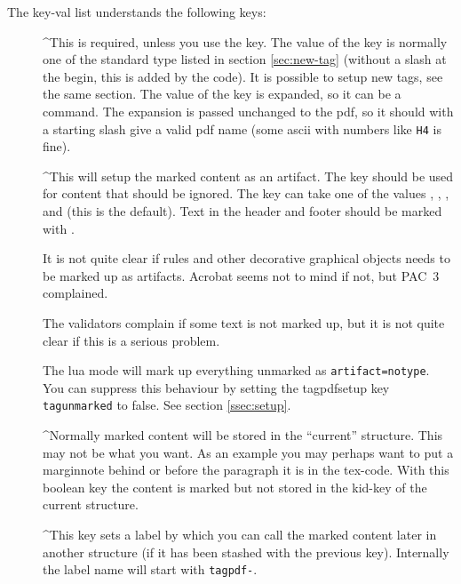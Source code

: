\documentclass[DIV=12,parskip=half-,bibliography=totoc]{scrartcl}
\begin{document}
\TagP The key-val list understands the following keys:\TagPend
\begin{description}
  \item[]
  \TagP^This is required, unless you use the  key. The value of the key is normally one of the standard type listed in section \ref{sec:new-tag} (without a slash at the begin, this is added by the code). It is possible to setup new tags, see the same section. The value of the key is expanded, so it can be a command. The expansion is passed unchanged to the pdf, so it should with a starting slash give a valid pdf name  (some ascii with numbers like \texttt{H4} is fine).\Pmeti

  \item[]
  \TagP^This will setup the marked content as an artifact. The key should be used for content that should be ignored. The key can take one of the values , ,  ,   and  (this is the default). Text in the header and footer should be marked with .

  \TagP    It is not quite clear if rules and other decorative graphical objects needs to be marked up as artifacts. Acrobat seems not to mind if not, but PAC~3 complained.

  \TagP    The validators complain if some text is not marked up, but it is not quite clear if this is a serious problem.

  \TagP    The lua mode will mark up everything unmarked as \texttt{artifact=notype}. You can suppress this behaviour by setting the tagpdfsetup key \texttt{tagunmarked} to false. See section \ref{ssec:setup}.\Pmeti

  \item[]
   \TagP^Normally marked content will be stored in the \enquote{current} structure. This may not be what you want. As an example you may perhaps want to put a marginnote behind or before the paragraph it is in the tex-code. With this boolean key the content is marked but not stored in the kid-key of the current structure.\Pmeti

  \item[]
  \TagP^This key sets a label by which you can call the marked content later in another structure (if it has been stashed with the previous key). Internally the label name will start with \texttt{tagpdf-}.\Pmeti


\end{description}
\end{document}
